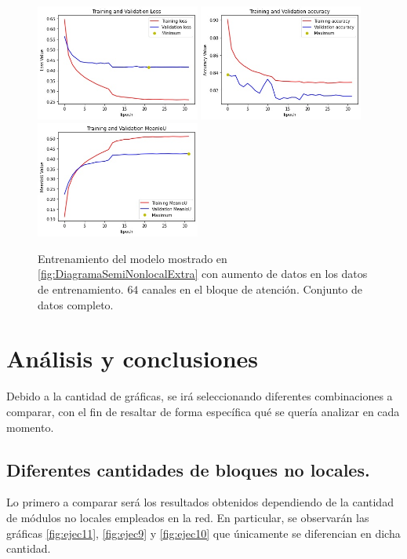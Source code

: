 \begin{figure}[htpb]
  \centering
  \includegraphics[width=0.48\textwidth]{../../modelos-entrenados/unet-semnonlocal-conv/ejecucion11/loss}
  \includegraphics[width=0.48\textwidth]{../../modelos-entrenados/unet-semnonlocal-conv/ejecucion11/acc}
  \includegraphics[width=0.48\textwidth]{../../modelos-entrenados/unet-semnonlocal-conv/ejecucion11/iou}
  \caption{Entrenamiento del modelo mostrado en \autoref{fig:DiagramaSemiNonlocalExtra} con aumento de datos en los datos de entrenamiento. $64$ canales en el bloque de atención. Conjunto de datos completo.}
  \label{fig:ejec11}
\end{figure}
\section{Análisis y conclusiones}

Debido a la cantidad de gráficas, se irá seleccionando diferentes combinaciones a comparar, con el fin de resaltar de forma específica qué se quería analizar en cada momento.\\

\subsection{Diferentes cantidades de bloques no locales.}
Lo primero a comparar será los resultados obtenidos dependiendo de la cantidad de módulos no locales empleados en la red. En particular, se observarán las gráficas \autoref{fig:ejec11}, \autoref{fig:ejec9} y \autoref{fig:ejec10} que únicamente se diferencian en dicha cantidad.\\

